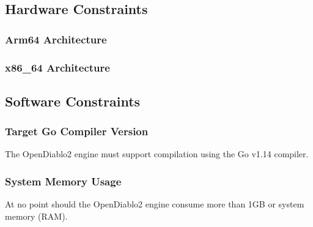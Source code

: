 \subsection{Hardware Constraints}
\subsubsection{Arm64 Architecture}
\subsubsection{x86\_64 Architecture}


\subsection{Software Constraints}
\subsubsection{Target Go Compiler Version}
The OpenDiablo2 engine must support compilation using the Go v1.14 compiler.


\subsubsection{System Memory Usage}
At no point should the OpenDiablo2 engine consume more than 1GB or system memory (RAM).

